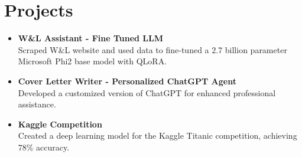 \section*{Projects}
\begin{itemize}[leftmargin=*]
    \item \textbf{W\&L Assistant - Fine Tuned LLM} \\
    Scraped W\&L website and used data to fine-tuned a 2.7 billion parameter Microsoft Phi2 base model with QLoRA.

    \item \textbf{Cover Letter Writer - Personalized ChatGPT Agent} \\
    Developed a customized version of ChatGPT for enhanced professional assistance.

    \item \textbf{Kaggle Competition} \\
    Created a deep learning model for the Kaggle Titanic competition, achieving 78\% accuracy.
\end{itemize}